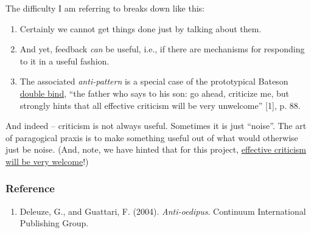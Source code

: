 The difficulty I am referring to breaks down like this:

\begin{enumerate}
\item
  Certainly we cannot get things done just by talking about them.
\item
  And yet, feedback \emph{can} be useful, i.e., if there are mechanisms
  for responding to it in a useful fashion.
\item
  The associated \emph{anti-pattern} is a special case of the
  prototypical Bateson
  \href{http://en.wikipedia.org/wiki/Double\_bind}{double bind}, ``the
  father who says to his son: go ahead, criticize me, but strongly hints
  that all effective criticism will be very unwelcome'' {[}1{]}, p. 88.
\end{enumerate}
And indeed -- criticism is not always useful. Sometimes it is just
``noise''. The art of paragogical praxis is to make something useful out
of what would otherwise just be noise\emph{.} (And, note, we have hinted
that for this project,
\href{http://peeragogy.org/how-to-use-this-handbook/}{effective
criticism will be very welcome}!)

\subsubsection{Reference}

\begin{enumerate}
\item
  Deleuze, G., and Guattari, F. (2004). \emph{Anti-oedipus}. Continuum
  International Publishing Group.
\end{enumerate}
